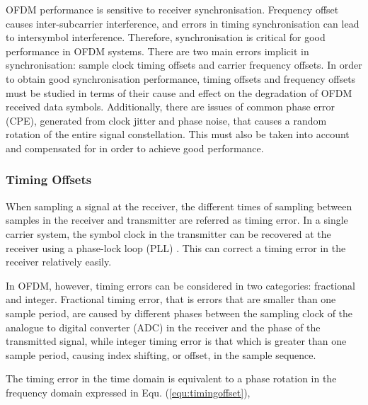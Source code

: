OFDM performance is sensitive to receiver synchronisation. 
Frequency offset causes inter-subcarrier interference, and errors in timing synchronisation can lead to intersymbol interference. 
Therefore, synchronisation is critical for good performance in OFDM systems. 
There are two main errors implicit in synchronisation: sample clock timing offsets and carrier frequency offsets.
In order to obtain good synchronisation performance, timing offsets and frequency offsets must be studied in terms of their cause and effect on the degradation of OFDM received data symbols.
Additionally, there are issues of common phase error (CPE), generated from clock jitter and phase noise, that causes a random rotation of the entire signal constellation.
This must also be taken into account and compensated for in order to achieve good performance.

\subsubsection{Timing Offsets}

When sampling a signal at the receiver, the different times of sampling between samples in the receiver and transmitter are referred as timing error.
In a single carrier system, the symbol clock in the transmitter can be recovered at the receiver using a phase-lock loop (PLL) \cite{farhang2008signal}. 
This can correct a timing error in the receiver relatively easily.

In OFDM, however, timing errors can be considered in two categories: fractional and integer. 
Fractional timing error, that is errors that are smaller than one sample period, are caused by different phases between the sampling clock of the analogue to digital converter (ADC) in the receiver and the phase of the transmitted signal, while integer timing error is that which is greater than one sample period, causing index shifting, or offset, in the sample sequence.

The timing error in the time domain is equivalent to a phase rotation in the frequency domain expressed in Equ. (\ref{equ:timingoffset}),


